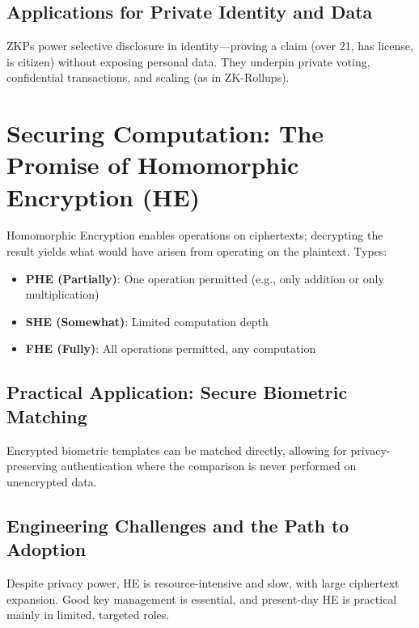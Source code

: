 \subsection{Applications for Private Identity and Data}
ZKPs power selective disclosure in identity—proving a claim (over 21, has license, is citizen) without exposing personal data. They underpin private voting, confidential transactions, and scaling (as in ZK-Rollups).

\section{Securing Computation: The Promise of Homomorphic Encryption (HE)}

Homomorphic Encryption enables operations on ciphertexts; decrypting the result yields what would have arisen from operating on the plaintext. Types:
\begin{itemize}
    \item \textbf{PHE (Partially)}: One operation permitted (e.g., only addition or only multiplication)
    \item \textbf{SHE (Somewhat)}: Limited computation depth
    \item \textbf{FHE (Fully)}: All operations permitted, any computation
\end{itemize}

\subsection{Practical Application: Secure Biometric Matching}
Encrypted biometric templates can be matched directly, allowing for privacy-preserving authentication where the comparison is never performed on unencrypted data.

\subsection{Engineering Challenges and the Path to Adoption}
Despite privacy power, HE is resource-intensive and slow, with large ciphertext expansion. Good key management is essential, and present-day HE is practical mainly in limited, targeted roles.

